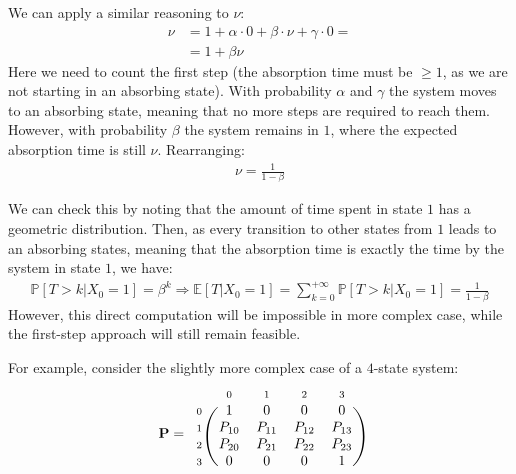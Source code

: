 \documentclass[../template.tex]{subfiles}
\begin{document}
\medskip

We can apply a similar reasoning to $\nu$:
\begin{align*}
    \nu &= 1 + \alpha \cdot 0 + \beta \cdot \nu + \gamma \cdot 0 =\\
    &= 1 + \beta \nu
\end{align*}
Here we need to count the first step (the absorption time must be $\geq 1$, as we are not starting in an absorbing state). With probability $\alpha$ and $\gamma$ the system moves to an absorbing state, meaning that no more steps are required to reach them. However, with probability $\beta$ the system remains in $1$, where the expected absorption time is still $\nu$. Rearranging:
\begin{align*}
    \nu = \frac{1}{1-\beta} 
\end{align*}

We can check this by noting that the amount of time spent in state $1$ has a geometric distribution. Then, as every transition to other states from $1$ leads to an absorbing states, meaning that the absorption time is exactly the time  by the system in state $1$, we have:
\begin{align*}
    \mathbb{P}[T > k|X_0 = 1] = \beta^k \Rightarrow \mathbb{E}[T|X_0 = 1] = \sum_{k=0}^{+\infty} \mathbb{P}[T>k|X_0=1] = \frac{1}{1-\beta} 
\end{align*}
However, this direct computation will be impossible in more complex case, while the first-step approach will still remain feasible.

\medskip

For example, consider the slightly more complex case of a $4$-state system:
\begin{align}\label{eqn:P-6}
    \textbf{P} = \begin{blockarray}{l*{4}{c}}
        \begin{block}{l*{4}{>{\scriptstyle}c<{}}}
            & 0 & 1 & 2 & 3\\
        \end{block}
        \begin{block}{>{\scriptstyle}r<{}(*{4}{c})}
            0 & 1 & 0 & 0 & 0\\
            1 & P_{10} & P_{11} & P_{12} & P_{13}\\
            2 & P_{20} & P_{21} & P_{22} & P_{23}\\
            3 & 0 & 0 & 0 & 1 \\
        \end{block}
    \end{blockarray}
\end{align}
\end{document}
